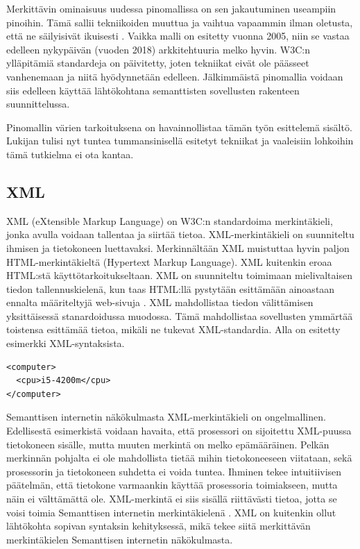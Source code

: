 \documentclass[finnish, 12pt, a4paper, elec, utf8, pdfa, online]{aaltothesis}
\begin{document}
Merkittävin ominaisuus uudessa pinomallissa on sen jakautuminen useampiin pinoihin. Tämä sallii tekniikoiden muuttua ja vaihtua vapaammin ilman oletusta, että ne säilyisivät ikuisesti \cite{stack}. Vaikka malli on esitetty vuonna 2005, niin se vastaa edelleen nykypäivän (vuoden 2018) arkkitehtuuria melko hyvin. W3C:n ylläpitämiä standardeja on päivitetty, joten tekniikat eivät ole päässeet vanhenemaan ja niitä hyödynnetään edelleen. Jälkimmäistä pinomallia voidaan siis edelleen käyttää lähtökohtana semanttisten sovellusten rakenteen suunnittelussa.

Pinomallin värien tarkoituksena on havainnollistaa tämän työn esittelemä sisältö. Lukijan tulisi nyt tuntea tummansinisellä esitetyt tekniikat ja vaaleisiin lohkoihin tämä tutkielma ei ota kantaa.




\subsection{XML}
XML (eXtensible Markup Language) on W3C:n standardoima merkintäkieli, jonka avulla voidaan tallentaa ja siirtää tietoa. XML-merkintäkieli on suunniteltu ihmisen ja tietokoneen luettavaksi. Merkinnältään XML muistuttaa hyvin paljon HTML-merkintäkieltä (Hypertext Markup Language). XML kuitenkin eroaa HTML:stä käyttötarkoitukseltaan. XML on suunniteltu toimimaan mielivaltaisen tiedon tallennuskielenä, kun taas HTML:llä pystytään esittämään ainoastaan ennalta määriteltyjä web-sivuja \cite{IEEE_XML}. XML mahdollistaa tiedon välittämisen yksittäisessä stanardoidussa muodossa. Tämä mahdollistaa sovellusten ymmärtää toistensa esittämää tietoa, mikäli ne tukevat XML-standardia. Alla on esitetty esimerkki XML-syntaksista.

\begin{lstlisting}[style=codeblock,caption={XML-syntaksiesimerkki.},captionpos=b,label={xml-esim}]
<computer>
  <cpu>i5-4200m</cpu>
</computer>
\end{lstlisting}

 Semanttisen internetin näkökulmasta XML-merkintäkieli on ongelmallinen. Edellisestä esimerkistä voidaan havaita, että prosessori on sijoitettu XML-puussa tietokoneen sisälle, mutta muuten merkintä on melko epämääräinen. Pelkän merkinnän pohjalta ei ole mahdollista tietää mihin tietokoneeseen viitataan, sekä prosessorin ja tietokoneen suhdetta ei voida tuntea. Ihminen tekee intuitiivisen päätelmän, että tietokone varmaankin käyttää prosessoria toimiakseen, mutta näin ei välttämättä ole. XML-merkintä ei siis sisällä riittävästi tietoa, jotta se voisi toimia Semanttisen internetin merkintäkielenä \cite{IEEE_XML}. XML on kuitenkin ollut lähtökohta sopivan syntaksin kehityksessä, mikä tekee siitä merkittävän merkintäkielen Semanttisen internetin näkökulmasta.
\end{document}
